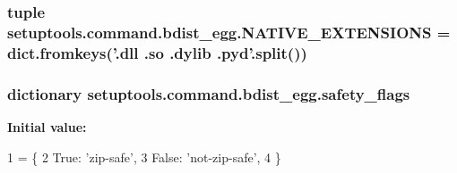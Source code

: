 \subsubsection[{N\+A\+T\+I\+V\+E\+\_\+\+E\+X\+T\+E\+N\+S\+I\+O\+N\+S}]{\setlength{\rightskip}{0pt plus 5cm}tuple setuptools.\+command.\+bdist\+\_\+egg.\+N\+A\+T\+I\+V\+E\+\_\+\+E\+X\+T\+E\+N\+S\+I\+O\+N\+S = dict.\+fromkeys('.dll .so .dylib .pyd'.split())}\label{namespacesetuptools_1_1command_1_1bdist__egg_a4a67a756a866524d67b62f24524d6f72}
\hypertarget{namespacesetuptools_1_1command_1_1bdist__egg_a13246e82c91f270961f661c12585d4f4}{}
\subsubsection[{safety\+\_\+flags}]{\setlength{\rightskip}{0pt plus 5cm}dictionary setuptools.\+command.\+bdist\+\_\+egg.\+safety\+\_\+flags}\label{namespacesetuptools_1_1command_1_1bdist__egg_a13246e82c91f270961f661c12585d4f4}
{\bfseries Initial value\+:}
\begin{DoxyCode}
1 = \{
2     \textcolor{keyword}{True}: \textcolor{stringliteral}{'zip-safe'},
3     \textcolor{keyword}{False}: \textcolor{stringliteral}{'not-zip-safe'},
4 \}
\end{DoxyCode}
